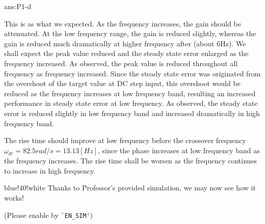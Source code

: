 \documentclass{tron}
\begin{document}
\begin{answer}{ans:P1-d}
\begin{remark}{}
		This is as what we expected. As the frequency increases, the gain should be attenuated. At the low frequency range, the gain is reduced slightly, whereas the gain is reduced much dramatically at higher frequency after (about 6Hz). We shall expect the peak value reduced and the steady state error enlarged as the frequency increased. As observed, the peak value is reduced throughout all frequency as frequency increased. Since the steady state error was originated from the overshoot of the target value at DC step input, this overshoot would be reduced as the frequency increases at low frequency band, resulting an increased performance in steady state error at low frequency. As observed, the steady state error is reduced slightly in low frequency band and increased dramatically in high frequency band. 
	
		The rise time should improve at low frequency before the crossover frequency $\omega_{gc} = 82.5 \unit{rad/s} = 13.13 [Hz]$, since the phase increases at low frequency band as the frequency increases. The rise time shall be worsen as the frequency continues to increase in high frequency. 
	\end{remark}


	\begin{note}{blue!40!white}{}
		Thanks to Professor's provided simulation, we may now see how it works! 
		
		(Please enable by \verb|`EN_SIM'|)
		

\end{note}
\end{answer}
\end{document}
